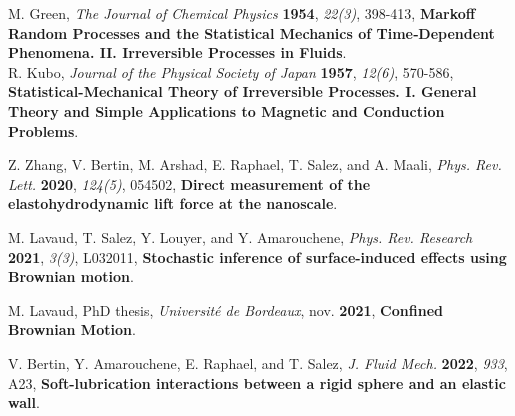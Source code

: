 \documentclass[fleqn,10pt]{InternshipReport-ENS-PSL}
\begin{document}
\begin{thebibliography}{99}
M. Green, {\it The Journal of Chemical Physics} {\bf 1954}, {\it 22(3)}, 398-413, {\bf Markoff Random Processes and the Statistical Mechanics of Time‐Dependent Phenomena. II. Irreversible Processes in Fluids}. \\
R. Kubo, {\it Journal of the Physical Society of Japan} {\bf 1957}, {\it 12(6)}, 570-586, {\bf Statistical-Mechanical Theory of Irreversible Processes. I. General Theory and Simple Applications to Magnetic and Conduction Problems}. 


%

Z. Zhang, V. Bertin, M. Arshad, E. Raphael, T. Salez, and A. Maali, {\it Phys. Rev. Lett.} {\bf 2020}, {\it 124(5)}, 054502, {\bf Direct measurement of the elastohydrodynamic lift force at the nanoscale}.

M. Lavaud, T. Salez, Y. Louyer, and Y. Amarouchene, {\it Phys. Rev. Research} {\bf 2021}, {\it 3(3)}, L032011, {\bf Stochastic inference of surface-induced effects using Brownian motion}.

M. Lavaud, PhD thesis, {\it Université de Bordeaux}, nov. {\bf 2021}, {\bf Confined Brownian Motion}.

V. Bertin, Y. Amarouchene, E. Raphael, and T. Salez, {\it J. Fluid Mech.} {\bf 2022}, {\it 933}, A23, {\bf Soft-lubrication interactions between a rigid sphere and an elastic wall}.


\end{thebibliography}
\end{document}
